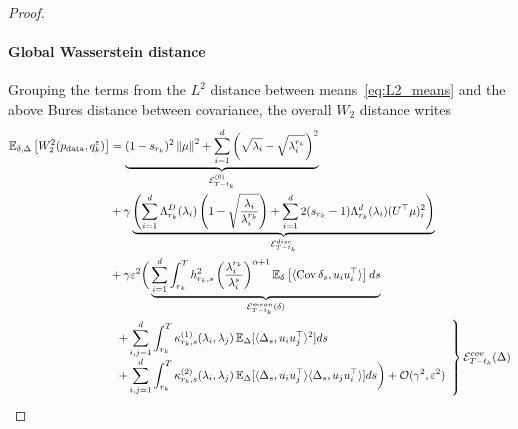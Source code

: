 \documentclass[11pt]{article}
\newcommand{\norm}[1]{\left\|{#1}\right\|}
\newcommand{\EE}{\mathbb{E}}
\newcommand{\cov}{\operatorname{Cov}}
\begin{document}
\begin{proof}
\paragraph{Global Wasserstein distance} Grouping the terms from the $L^2$ distance between means~\eqref{eq:L2_means} and the above Bures distance between covariance, the overall $W_2$ distance writes
\begin{equation*}
\begin{split}
    \EE_{\delta, \Delta} \left[W_2^2(p_\mathrm{data},q_k^\varepsilon)\right]  &= \underbrace{ (1- s_{r_k})^2\norm{\mu}^2 + 
    \sum_{i=1}^d \left(\sqrt{\lambda_i} - \sqrt{\lambda^{r_k}_i} \right)^2}_{\mathcal{E}_{T-t_k}^{(0)}} \\
    &+ \gamma \underbrace{\left( \sum_{i=1}^d\Lambda^{D}_{r_k}(\lambda_i) \left( 1 - \sqrt{\frac{\lambda_i}{\lambda^{r_k}_i}} \right)  + \sum_{i=1}^d 2 (s_{r_k}-1) \Lambda^{d}_{r_k}(\lambda_i)(U^\top \mu)^2_i \right)}_{\mathcal{E}_{T-t_k}^{disc}}  \\
    &+ \gamma \varepsilon^2 \biggr( \underbrace{\sum_{i=1}^d \int_{r_k}^{T} h_{r_k,s}^2 \left(\frac{\lambda_i^{r_k}}{\lambda_i^{s}}\right)^{\alpha+1} \EE_{\delta} \left[\langle \cov \delta_{s}, u_i u_i^\top \rangle\right]ds}_{\mathcal{E}_{T-t_k}^{mean}(\delta)} \\
&
\left.
\begin{array}{l} 
\displaystyle + \sum_{i,j=1}^d   \int_{r_k}^{T} \kappa^{(1)}_{r_k, s} (\lambda_i, \lambda_j) \, \EE_{\Delta}[\langle \Delta_{s}, u_iu_j^\top \rangle^2] ds \\
\displaystyle +  \sum_{i,j=1}^d  \int_{r_k}^{T} \kappa^{(2)}_{r_k, s}(\lambda_i,\lambda_j) \, \EE_{\Delta}[\langle \Delta_{s}, u_iu_j^\top \rangle \langle \Delta_{s}, u_ju_i^\top \rangle ]ds \biggr) + \mathcal{O}(\gamma^2, \varepsilon^2)
\end{array} 
\right\}
{\scriptsize \mathcal{E}_{T-t_k}^{cov}(\Delta)} 
\end{split}
\end{equation*}


\end{proof}
\end{document}
